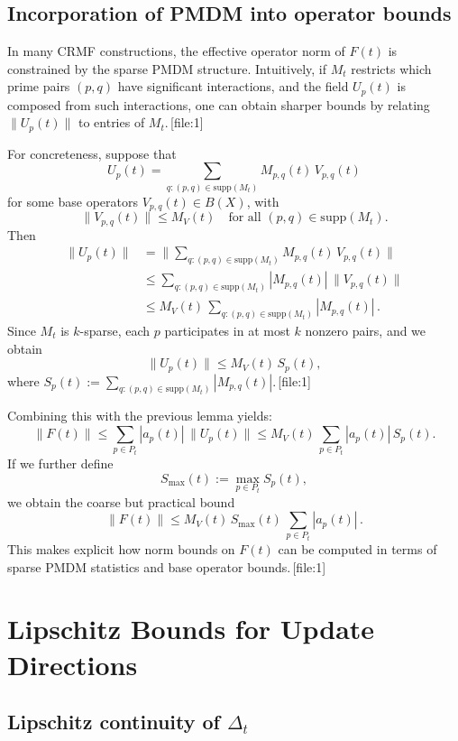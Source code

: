 \documentclass[11pt]{article}
\begin{document}
\subsection{Incorporation of PMDM into operator bounds}

In many CRMF constructions, the effective operator norm of $F(t)$ is constrained by the sparse PMDM structure.
Intuitively, if $M_t$ restricts which prime pairs $(p,q)$ have significant interactions, and the field $U_p(t)$ is composed from such interactions, one can obtain sharper bounds by relating $\|U_p(t)\|$ to entries of $M_t$.\,[file:1]

For concreteness, suppose that
\[
  U_p(t) = \sum_{q : (p,q)\in \mathrm{supp}(M_t)} M_{p,q}(t)\, V_{p,q}(t)
\]
for some base operators $V_{p,q}(t)\in B(X)$, with
\[
  \|V_{p,q}(t)\| \le M_V(t) \quad \text{for all }(p,q)\in\mathrm{supp}(M_t).
\]
Then
\begin{align*}
  \|U_p(t)\|
    &= \Big\|\sum_{q:(p,q)\in\mathrm{supp}(M_t)} M_{p,q}(t)\,V_{p,q}(t)\Big\| \\
    &\le \sum_{q:(p,q)\in\mathrm{supp}(M_t)} |M_{p,q}(t)|\,\|V_{p,q}(t)\| \\
    &\le M_V(t)\,\sum_{q:(p,q)\in\mathrm{supp}(M_t)} |M_{p,q}(t)|\,.
\end{align*}
Since $M_t$ is $k$-sparse, each $p$ participates in at most $k$ nonzero pairs, and we obtain
\[
  \|U_p(t)\| \le M_V(t)\,S_p(t),
\]
where $S_p(t) := \sum_{q:(p,q)\in\mathrm{supp}(M_t)} |M_{p,q}(t)|$.\,[file:1]

Combining this with the previous lemma yields:
\[
  \|F(t)\|
  \le \sum_{p\in P_t} |a_p(t)|\,\|U_p(t)\|
  \le M_V(t)\,\sum_{p\in P_t} |a_p(t)|\,S_p(t).
\]
If we further define
\[
  S_{\max}(t) := \max_{p\in P_t} S_p(t),
\]
we obtain the coarse but practical bound
\[
  \|F(t)\| \le M_V(t)\,S_{\max}(t)\,\sum_{p\in P_t} |a_p(t)|\,.
\]
This makes explicit how norm bounds on $F(t)$ can be computed in terms of sparse PMDM statistics and base operator bounds.\,[file:1]

\section{Lipschitz Bounds for Update Directions}

\subsection{Lipschitz continuity of $\Delta_t$}
\end{document}
